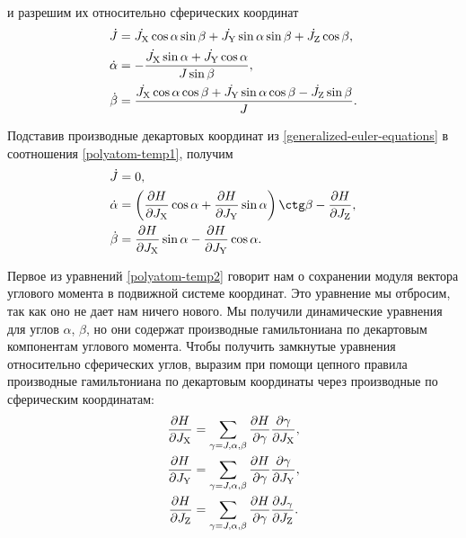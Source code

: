 и разрешим их относительно сферических координат
\begin{gather}
    \begin{aligned}
        \dot{J} &= \dot{J_\text{X}} \cos \alpha \sin \beta + \dot{J_\text{Y}} \sin \alpha \sin \beta + \dot{J_\text{Z}} \cos \beta, \\
        \dot{\alpha} &= -\frac{\dot{J_\text{X}} \sin \alpha + \dot{J_\text{Y}} \cos \alpha}{J \sin \beta}, \\
        \dot{\beta} &= \frac{\dot{J_\text{X}} \cos \alpha \cos \beta + \dot{J_\text{Y}} \sin \alpha \cos \beta  - \dot{J_\text{Z}} \sin \beta}{J}.
    \end{aligned} \label{polyatom-temp1}
\end{gather}

Подставив производные декартовых координат из \eqref{generalized-euler-equations} в соотношения \eqref{polyatom-temp1}, получим
\begin{gather}
    \begin{aligned}
        \dot{J} &= 0, \\
        \dot{\alpha} &= \lb \frac{\partial H}{\partial \Jx} \cos \alpha + \frac{\partial H}{\partial \Jy} \sin \alpha \rb \ctg \beta - \frac{\partial H}{\partial \Jz}, \\
        \dot{\beta} &= \frac{\partial H}{\partial \Jx} \sin \alpha - \frac{\partial H}{\partial \Jy} \cos \alpha.
    \end{aligned} \label{polyatom-temp2}
\end{gather}

Первое из уравнений \eqref{polyatom-temp2} говорит нам о сохранении модуля вектора углового момента в подвижной системе координат. Это уравнение мы отбросим, так как оно не дает нам ничего нового. Мы получили динамические уравнения для углов $\alpha$, $\beta$, но они содержат производные гамильтониана по декартовым компонентам углового момента. Чтобы получить замкнутые уравнения относительно сферических углов, выразим при помощи цепного правила производные гамильтониана по декартовым координаты через производные по сферическим координатам:    
\begin{gather}
    \begin{aligned}
        \frac{\partial H}{\partial J_\text{X}} &= \sum_{\gamma = J, \alpha, \beta} \frac{\partial H}{\partial \gamma} \frac{\partial \gamma}{\partial J_\text{X}}, \\
        \frac{\partial H}{\partial J_\text{Y}} &= \sum_{\gamma = J, \alpha, \beta} \frac{\partial H}{\partial \gamma} \frac{\partial \gamma}{\partial J_\text{Y}}, \\
        \frac{\partial H}{\partial J_\text{Z}} &= \sum_{\gamma = J, \alpha, \beta} \frac{\partial H}{\partial \gamma} \frac{\partial J_\gamma}{\partial J_\text{Z}}.
    \end{aligned} \label{polyatom-temp3}
\end{gather}

